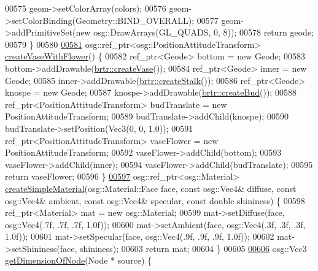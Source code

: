 \begin{DoxyCode}
00575         geom->setColorArray(colors);
00576         geom->setColorBinding(Geometry::BIND\_OVERALL);
00577         geom->addPrimitiveSet(\textcolor{keyword}{new} osg::DrawArrays(GL\_QUADS, 0, 8));
00578         \textcolor{keywordflow}{return} geode;
00579     \}
00580 
\hypertarget{_util_functions_8cpp_source_l00581}{}\hyperlink{namespacebrtr_a05625aff9337331ae351d283f79f0f1e}{00581}     osg::ref\_ptr<osg::PositionAttitudeTransform> \hyperlink{namespacebrtr_a05625aff9337331ae351d283f79f0f1e}{createVaseWithFlower}() \{
00582         ref\_ptr<Geode> bottom = \textcolor{keyword}{new} Geode;
00583         bottom->addDrawable(\hyperlink{namespacebrtr_ab4f3c063f7a8fa6cc33a8cb52b036d27}{brtr::createVase}());
00584         ref\_ptr<Geode> inner = \textcolor{keyword}{new} Geode;
00585         inner->addDrawable(\hyperlink{namespacebrtr_a4ccd9746e37278e47832da270dc00fb3}{brtr::createStalk}());
00586         ref\_ptr<Geode> knospe = \textcolor{keyword}{new} Geode;
00587         knospe->addDrawable(\hyperlink{namespacebrtr_a51b3741c30ca1b6282b9693055ddc060}{brtr::createBud}());
00588         ref\_ptr<PositionAttitudeTransform> budTranslate = \textcolor{keyword}{new} PositionAttitudeTransform;
00589         budTranslate->addChild(knospe);
00590         budTranslate->setPosition(Vec3(0, 0, 1.0));
00591         ref\_ptr<PositionAttitudeTransform> vaseFlower = \textcolor{keyword}{new} PositionAttitudeTransform;
00592         vaseFlower->addChild(bottom);
00593         vaseFlower->addChild(inner);
00594         vaseFlower->addChild(budTranslate);
00595         \textcolor{keywordflow}{return} vaseFlower;
00596     \}
\hypertarget{_util_functions_8cpp_source_l00597}{}\hyperlink{namespacebrtr_a7b54dcabf5846ea963221e59b38b0a79}{00597}     osg::ref\_ptr<osg::Material> \hyperlink{namespacebrtr_a7b54dcabf5846ea963221e59b38b0a79}{createSimpleMaterial}(osg::Material::Face face, \textcolor{keyword}{const} 
      osg::Vec4& diffuse, \textcolor{keyword}{const} osg::Vec4& ambient, \textcolor{keyword}{const} osg::Vec4& specular, \textcolor{keyword}{const} \textcolor{keywordtype}{double} shininess) \{
00598         ref\_ptr<Material> mat = \textcolor{keyword}{new} osg::Material;
00599         mat->setDiffuse(face, osg::Vec4(.7f, .7f, .7f, 1.0f));
00600         mat->setAmbient(face, osg::Vec4(.3f, .3f, .3f, 1.0f));
00601         mat->setSpecular(face, osg::Vec4(.9f, .9f, .9f, 1.0f));
00602         mat->setShininess(face, shininess);
00603         \textcolor{keywordflow}{return} mat;
00604     \}
00605 
\hypertarget{_util_functions_8cpp_source_l00606}{}\hyperlink{namespacebrtr_acdb44124f5beeb960792c874499276db}{00606}     osg::Vec3 \hyperlink{namespacebrtr_acdb44124f5beeb960792c874499276db}{getDimensionOfNode}(Node * source) \{

\end{DoxyCode}
